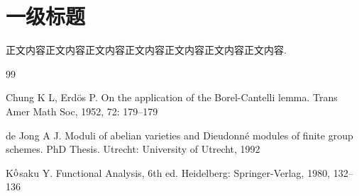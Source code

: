 \documentclass{SCIA2023cn}
\theoremstyle{mystyle}
\begin{document}
\section{一级标题}
正文内容正文内容正文内容正文内容正文内容正文内容正文内容.



\begin{thebibliography}{99}  %

 Chung K L, Erd\"os P. On the application of the Borel-Cantelli lemma. Trans Amer Math Soc, 1952, 72: 179--179 %

 de Jong A J. Moduli of abelian varieties and Dieudonn\'e modules of finite group schemes. PhD Thesis. Utrecht: University  of Utrecht, 1992

 K$\hat{\rm o}$saku Y. Functional Analysis, 6th ed. Heidelberg: Springer-Verlag, 1980, 132--136

\end{thebibliography}

\makeentitle

\end{document}

